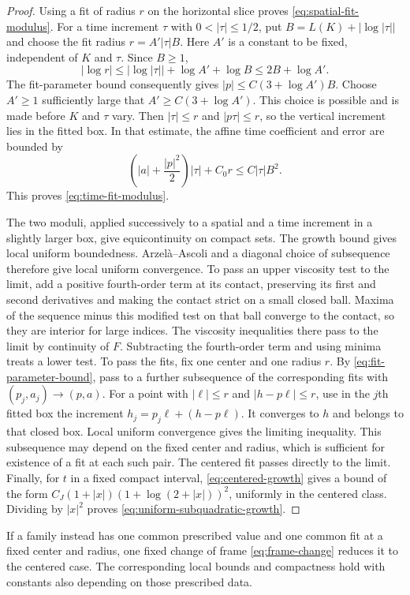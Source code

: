 \documentclass[11pt]{article}
\numberwithin{equation}{section}
\theoremstyle{definition}
\theoremstyle{remark}
\begin{document}
\begin{proof}
Using a fit of radius $r$ on the horizontal slice proves
\eqref{eq:spatial-fit-modulus}. For a time increment $\tau$ with
$0<|\tau|\le1/2$, put
$B=L(K)+|\log|\tau||$ and choose the fit radius
$r=A'|\tau|B$. Here $A'$ is a constant to be fixed, independent of
$K$ and $\tau$. Since $B\ge1$,
\[
  |\log r|\le|\log|\tau||+\log A'+\log B
       \le2B+\log A'.
\]
The fit-parameter bound consequently gives
$|p|\le C(3+\log A')B$. Choose $A'\ge1$ sufficiently large that
$A'\ge C(3+\log A')$. This choice is possible and is made before
$K$ and $\tau$ vary. Then $|\tau|\le r$ and $|p\tau|\le r$, so
the vertical increment lies in the fitted box. In that estimate,
the affine time coefficient and error are bounded by
\[
  \left(|a|+\frac{|p|^2}{2}\right)|\tau|+C_0r
      \le C|\tau|B^2.
\]
This proves \eqref{eq:time-fit-modulus}.

The two moduli, applied successively to a spatial and a time
increment in a slightly larger box, give equicontinuity on compact
sets. The growth bound gives local uniform boundedness.
Arzel\`a--Ascoli and a diagonal choice of subsequence therefore
give local uniform convergence. To pass an upper viscosity test
to the limit, add a positive fourth-order term at its contact,
preserving its first and second derivatives and making the
contact strict on a small closed ball. Maxima of the sequence
minus this modified test on that ball converge to the contact,
so they are interior for large indices. The viscosity
inequalities there pass to the limit by continuity of $F$.
Subtracting the fourth-order term and using minima treats a
lower test. To pass the fits, fix one
center and one radius $r$. By \eqref{eq:fit-parameter-bound}, pass
to a further subsequence of the corresponding fits with
$(p_j,a_j)\to(p,a)$. For a point with
$|\ell|\le r$ and $|h-p\ell|\le r$, use in the $j$th fitted box
the increment
$h_j=p_j\ell+(h-p\ell)$. It converges to $h$ and belongs to that
closed box. Local uniform convergence gives the limiting
inequality. This subsequence may depend on the fixed center and
radius, which is sufficient for existence of a fit at each such
pair. The centered fit passes directly to the limit.
Finally, for $t$ in a fixed compact interval,
\eqref{eq:centered-growth} gives a bound of the form
$C_J(1+|x|)(1+\log(2+|x|))^2$, uniformly in the centered class.
Dividing by $|x|^2$ proves
\eqref{eq:uniform-subquadratic-growth}.
\end{proof}

If a family instead has one common prescribed value and one common
fit at a fixed center and radius, one fixed change of frame
\eqref{eq:frame-change} reduces it to the centered case. The
corresponding local bounds and compactness hold with constants
also depending on those prescribed data.
\end{document}
